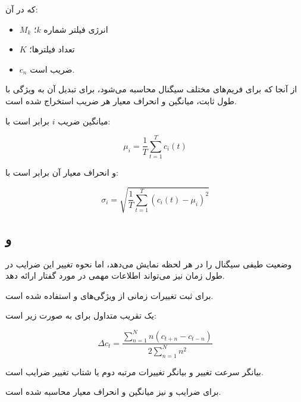 که در آن:

\begin{itemize}
	\item $M_k$ انرژی فیلتر  شماره $k$؛
	\item $K$ تعداد فیلترها؛
	\item $c_n$ ضریب  است.
\end{itemize}

از آنجا که
برای فریم‌های مختلف سیگنال محاسبه می‌شود، برای تبدیل آن به ویژگی با طول ثابت، میانگین و انحراف معیار هر ضریب استخراج شده است.

میانگین ضریب $i$ برابر است با:

\begin{equation}
\mu_i
=
\frac{1}{T}
\sum_{t=1}^{T}
c_i(t)
\end{equation}

و انحراف معیار آن برابر است با:

\begin{equation}
\sigma_i
=
\sqrt{
\frac{1}{T}
\sum_{t=1}^{T}
(c_i(t)-\mu_i)^2
}
\end{equation}

\subsection{ و }

وضعیت طیفی سیگنال را در هر لحظه نمایش می‌دهد، اما نحوه تغییر این ضرایب در طول زمان نیز می‌تواند اطلاعات مهمی در مورد گفتار ارائه دهد.

برای ثبت تغییرات زمانی از ویژگی‌های
و
استفاده شده است.

یک تقریب متداول برای
به صورت زیر است:

\begin{equation}
\Delta c_t
=
\frac{
\sum_{n=1}^{N}
n(c_{t+n}-c_{t-n})
}{
2
\sum_{n=1}^{N}
n^2
}
\end{equation}

بیانگر سرعت تغییر
و
بیانگر تغییرات مرتبه دوم یا شتاب تغییر ضرایب است.

برای ضرایب
و
نیز میانگین و انحراف معیار محاسبه شده است.


\subsection{}

